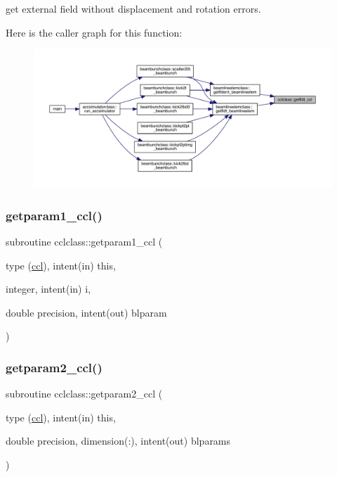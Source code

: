 get external field without displacement and rotation errors. 

Here is the caller graph for this function\+:\nopagebreak
\begin{figure}[H]
\begin{center}
\leavevmode
\includegraphics[width=350pt]{namespacecclclass_a4b07c783aa0e272c4924db67320c70d3_icgraph}
\end{center}
\end{figure}
\mbox{\label{namespacecclclass_a3cb17684a6eef64dd3c35cbb03bcb8b3}} 
\subsubsection{\texorpdfstring{getparam1\_ccl()}{getparam1\_ccl()}}
{\footnotesize\ttfamily subroutine cclclass\+::getparam1\+\_\+ccl (\begin{DoxyParamCaption}\item[{type (\mbox{\hyperlink{namespacecclclass_structcclclass_1_1ccl}{ccl}}), intent(in)}]{this,  }\item[{integer, intent(in)}]{i,  }\item[{double precision, intent(out)}]{blparam }\end{DoxyParamCaption})}

\mbox{\label{namespacecclclass_ad1c56a9447d1ff854afdc5502ae0fe18}} 
\subsubsection{\texorpdfstring{getparam2\_ccl()}{getparam2\_ccl()}}
{\footnotesize\ttfamily subroutine cclclass\+::getparam2\+\_\+ccl (\begin{DoxyParamCaption}\item[{type (\mbox{\hyperlink{namespacecclclass_structcclclass_1_1ccl}{ccl}}), intent(in)}]{this,  }\item[{double precision, dimension(\+:), intent(out)}]{blparams }\end{DoxyParamCaption})}

